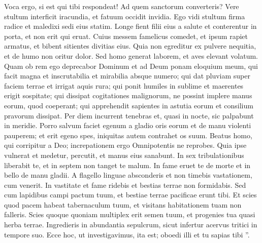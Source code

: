 \begin{biblechapter}
\begin{biblechapter}
\begin{biblechapter}
\begin{biblechapter}
\begin{biblechapter}
\verse Voca ergo, si est qui tibi respondeat!
 Ad quem sanctorum converteris?
 \verse Vere stultum interficit iracundia,
 et fatuum occidit invidia.
 \verse Ego vidi stultum firma radice
 et maledixi sedi eius statim.
 \verse Longe fient filii eius a salute
 et conterentur in porta, et non erit qui eruat.
 \verse Cuius messem famelicus comedet,
 et ipsum rapiet armatus, et bibent sitientes divitias eius.
 \verse Quia non egreditur ex pulvere nequitia,
 et de humo non oritur dolor.
 \verse Sed homo generat laborem,
 et aves elevant volatum.
 \verse Quam ob rem ego deprecabor Dominum
 et ad Deum ponam eloquium meum,
 \verse qui facit magna et inscrutabilia
 et mirabilia absque numero;
 \verse qui dat pluviam super faciem terrae
 et irrigat aquis rura;
 \verse qui ponit humiles in sublime
 et maerentes erigit sospitate;
 \verse qui dissipat cogitationes malignorum,
 ne possint implere manus eorum, quod coeperant;
 \verse qui apprehendit sapientes in astutia eorum
 et consilium pravorum dissipat.
 \verse Per diem incurrent tenebras
 et, quasi in nocte, sic palpabunt in meridie.
 \verse Porro salvum faciet egenum a gladio oris eorum
 et de manu violenti pauperem;
 \verse et erit egeno spes,
 iniquitas autem contrahet os suum.
 \verse Beatus homo, qui corripitur a Deo;
 increpationem ergo Omnipotentis ne reprobes.
 \verse Quia ipse vulnerat et medetur,
 percutit, et manus eius sanabunt.
 \verse In sex tribulationibus liberabit te,
 et in septem non tanget te malum. 
\verse In fame eruet te de morte
 et in bello de manu gladii.
 \verse A flagello linguae absconderis
 et non timebis vastationem, cum venerit.
 \verse In vastitate et fame ridebis
 et bestias terrae non formidabis.
 \verse Sed cum lapidibus campi pactum tuum,
 et bestiae terrae pacificae erunt tibi. 
\verse Et scies quod pacem habeat tabernaculum tuum,
 et visitans habitationem tuam non falleris.
 \verse Scies quoque quoniam multiplex erit semen tuum,
 et progenies tua quasi herba terrae.
 \verse Ingredieris in abundantia sepulcrum,
 sicut infertur acervus tritici in tempore suo.
 \verse Ecce hoc, ut investigavimus, ita est;
 oboedi illi et tu sapias tibi ”.
 

\end{biblechapter}
\end{biblechapter}
\end{biblechapter}
\end{biblechapter}
\end{biblechapter}
